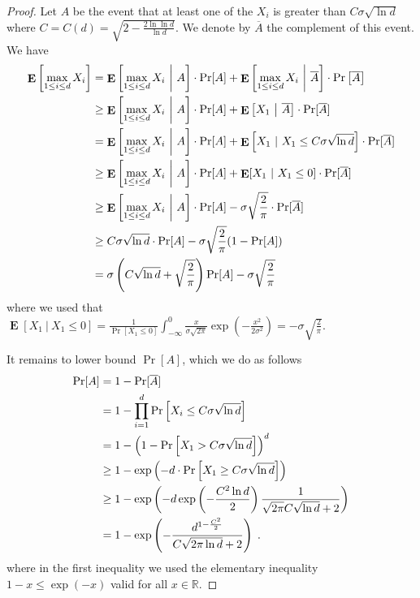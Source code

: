 \documentclass{article}
\DeclareMathOperator*{\Exp}{\mathbf{E}}
\newcommand{\field}[1]{\mathbb{#1}}
\newcommand{\R}{\field{R}}
\begin{document}
\begin{proof}
Let $A$ be the event that at least one of the $X_i$ is greater than $C \sigma
\sqrt{\ln d}$ where $C = C(d) = \sqrt{2 - \frac{2 \ln \ln d}{\ln d}}$. We
denote by $\overline{A}$ the complement of this event. We have
\begin{align}
\Exp \left[ \max_{1 \le i \le d} X_i \right]
& = \Exp \left[ \max_{1 \le i \le d} X_i ~ \middle|~ A \right] \cdot \Pr[A] + \Exp \left[ \max_{1 \le i \le d} X_i ~\middle|~ \overline{A} \right] \cdot \Pr \left[ \overline{A} \right] \notag \\
& \ge \Exp \left[ \max_{1 \le i \le d} X_i ~\middle|~ A \right] \cdot \Pr[A] + \Exp \left[ X_1 ~\middle|~ \overline{A} \right] \cdot \Pr[\overline{A}] \notag \\
& = \Exp \left[ \max_{1 \le i \le d} X_i~\middle|~ A \right] \cdot \Pr[A] + \Exp \left[ X_1~|~ X_1 \le C \sigma \sqrt{\ln d} \right] \cdot \Pr[\overline{A}] \notag \\
& \ge \Exp \left[ \max_{1 \le i \le d} X_i~\middle|~ A \right] \cdot \Pr[A] + \Exp[X_1~|~ X_1 \le 0] \cdot \Pr[\overline{A}] \notag \\
& \ge \Exp \left[ \max_{1 \le i \le d} X_i~\middle|~ A \right] \cdot \Pr[A] - \sigma \sqrt{\frac{2}{\pi}} \cdot \Pr[\overline{A}] \notag \\
& \ge C \sigma \sqrt{\ln d} \cdot \Pr[A] - \sigma \sqrt{\frac{2}{\pi}} (1 - \Pr[A]) \notag \\
& = \sigma \left(C\sqrt{\ln d} + \sqrt{\frac{2}{\pi}}\right) \Pr[A] -  \sigma \sqrt{\frac{2}{\pi}} \label{equation:maximum-of-gaussians-lower-bound-3}
\end{align}
where we used that $\Exp[X_1 ~|~ X_1 \le 0] = \frac{1}{\Pr[X_1 \le 0]} \int_{-\infty}^0 \frac{x}{\sigma \sqrt{2\pi}} \exp \left(- \frac{x^2}{2\sigma^2} \right) = - \sigma \sqrt{\frac{2}{\pi}}$.

It remains to lower bound $\Pr[A]$, which we do as follows
\begin{align}
\Pr[A]
& = 1 - \Pr[\overline{A}] \notag \\
& = 1 - \prod_{i=1}^d \Pr \left[ X_i \le C \sigma \sqrt{\ln d} \right]  \notag \\
& = 1 - \left(1 - \Pr\left[ X_1 > C \sigma \sqrt{\ln d} \right] \right)^d \notag \\
& \ge 1 - \exp\left(-d \cdot \Pr\left[X_1 \ge C \sigma \sqrt{\ln d} \right]\right) \notag \\
& \ge 1 - \exp\left(-d \exp\left(-\frac{C^2 \ln d}{2}\right) \frac{1}{\sqrt{2\pi}C \sqrt{\ln d}+2} \right) \notag \\
& = 1 - \exp\left(-\frac{d^{1-\frac{C^2}{2}}}{C \sqrt{2\pi \ln d}+2}\right) \label{equation:maximum-of-gaussians-lower-bound-4} \; .
\end{align}
where in the first inequality we used the elementary inequality $1 - x \le \exp(-x)$ valid for all $x \in \R$.


\end{proof}
\end{document}
